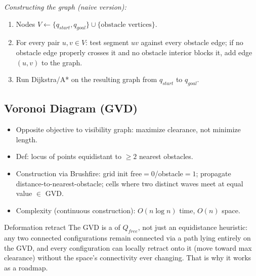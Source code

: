 \textit{Constructing the graph (naive version):}
\begin{enumerate}
\item Nodes $V \gets \{q_{start}, q_{goal}\} \cup \{\text{obstacle vertices}\}$.
\item For every pair $u,v\in V$: test segment $uv$ against every obstacle edge; if no obstacle edge properly crosses it and no obstacle interior blocks it, add edge $(u,v)$ to the graph.
\item Run Dijkstra/A* on the resulting graph from $q_{start}$ to $q_{goal}$.
\end{enumerate}

\begin{democallout}
\end{democallout}

\subsection{Voronoi Diagram (GVD)}
\label{sssec:gvd}
\begin{itemize}
\item Opposite objective to visibility graph: maximize clearance, not minimize length.
\item Def: locus of points equidistant to $\ge2$ nearest obstacles.
\item Construction via Brushfire: grid init free$=0$/obstacle$=1$; propagate distance-to-nearest-obstacle; cells where two distinct waves meet at equal value $\in$ GVD.
\item Complexity (continuous construction): $O(n\log n)$ time, $O(n)$ space.
\end{itemize}


\begin{defbox}{Deformation retract}
The GVD is a  of $Q_{free}$, not just an equidistance heuristic: any two connected configurations remain connected via a path lying entirely on the GVD, and every configuration can locally retract onto it (move toward max clearance) without the space's connectivity ever changing. That is why it works as a roadmap.
\end{defbox}
\begin{democallout}
\end{democallout}

